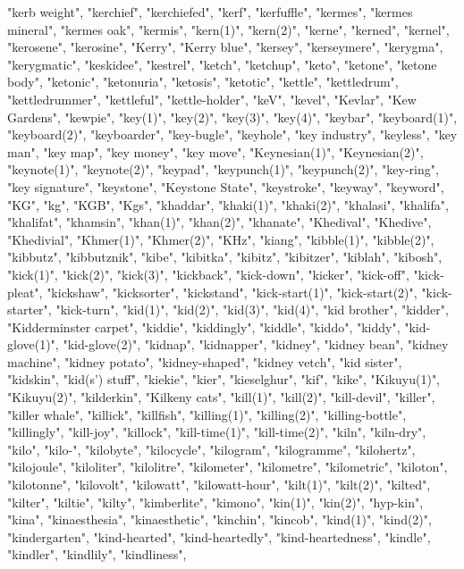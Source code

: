 "kerb weight",
"kerchief",
"kerchiefed",
"kerf",
"kerfuffle",
"kermes",
"kermes mineral",
"kermes oak",
"kermis",
"kern(1)",
"kern(2)",
"kerne",
"kerned",
"kernel",
"kerosene",
"kerosine",
"Kerry",
"Kerry blue",
"kersey",
"kerseymere",
"kerygma",
"kerygmatic",
"keskidee",
"kestrel",
"ketch",
"ketchup",
"keto",
"ketone",
"ketone body",
"ketonic",
"ketonuria",
"ketosis",
"ketotic",
"kettle",
"kettledrum",
"kettledrummer",
"kettleful",
"kettle-holder",
"keV",
"kevel",
"Kevlar",
"Kew Gardens",
"kewpie",
"key(1)",
"key(2)",
"key(3)",
"key(4)",
"keybar",
"keyboard(1)",
"keyboard(2)",
"keyboarder",
"key-bugle",
"keyhole",
"key industry",
"keyless",
"key man",
"key map",
"key money",
"key move",
"Keynesian(1)",
"Keynesian(2)",
"keynote(1)",
"keynote(2)",
"keypad",
"keypunch(1)",
"keypunch(2)",
"key-ring",
"key signature",
"keystone",
"Keystone State",
"keystroke",
"keyway",
"keyword",
"KG",
"kg",
"KGB",
"Kgs",
"khaddar",
"khaki(1)",
"khaki(2)",
"khalasi",
"khalifa",
"khalifat",
"khamsin",
"khan(1)",
"khan(2)",
"khanate",
"Khedival",
"Khedive",
"Khedivial",
"Khmer(1)",
"Khmer(2)",
"KHz",
"kiang",
"kibble(1)",
"kibble(2)",
"kibbutz",
"kibbutznik",
"kibe",
"kibitka",
"kibitz",
"kibitzer",
"kiblah",
"kibosh",
"kick(1)",
"kick(2)",
"kick(3)",
"kickback",
"kick-down",
"kicker",
"kick-off",
"kick-pleat",
"kickshaw",
"kicksorter",
"kickstand",
"kick-start(1)",
"kick-start(2)",
"kick-starter",
"kick-turn",
"kid(1)",
"kid(2)",
"kid(3)",
"kid(4)",
"kid brother",
"kidder",
"Kidderminster carpet",
"kiddie",
"kiddingly",
"kiddle",
"kiddo",
"kiddy",
"kid-glove(1)",
"kid-glove(2)",
"kidnap",
"kidnapper",
"kidney",
"kidney bean",
"kidney machine",
"kidney potato",
"kidney-shaped",
"kidney vetch",
"kid sister",
"kidskin",
"kid(s') stuff",
"kiekie",
"kier",
"kieselghur",
"kif",
"kike",
"Kikuyu(1)",
"Kikuyu(2)",
"kilderkin",
"Kilkeny cats",
"kill(1)",
"kill(2)",
"kill-devil",
"killer",
"killer whale",
"killick",
"killfish",
"killing(1)",
"killing(2)",
"killing-bottle",
"killingly",
"kill-joy",
"killock",
"kill-time(1)",
"kill-time(2)",
"kiln",
"kiln-dry",
"kilo",
"kilo-",
"kilobyte",
"kilocycle",
"kilogram",
"kilogramme",
"kilohertz",
"kilojoule",
"kiloliter",
"kilolitre",
"kilometer",
"kilometre",
"kilometric",
"kiloton",
"kilotonne",
"kilovolt",
"kilowatt",
"kilowatt-hour",
"kilt(1)",
"kilt(2)",
"kilted",
"kilter",
"kiltie",
"kilty",
"kimberlite",
"kimono",
"kin(1)",
"kin(2)",
"hyp-kin",
"kina",
"kinaesthesia",
"kinaesthetic",
"kinchin",
"kincob",
"kind(1)",
"kind(2)",
"kindergarten",
"kind-hearted",
"kind-heartedly",
"kind-heartedness",
"kindle",
"kindler",
"kindlily",
"kindliness",
